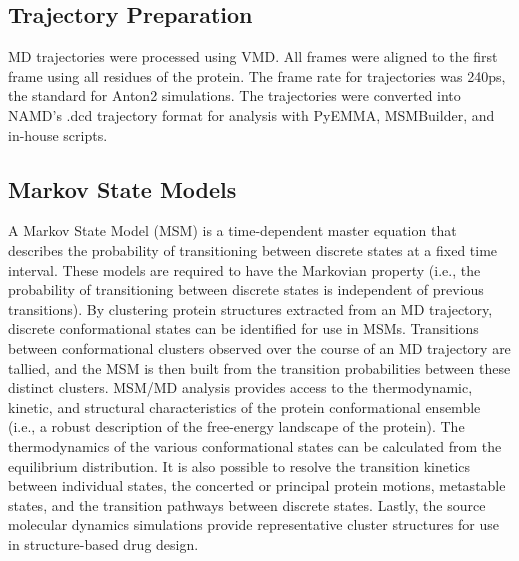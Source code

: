 \documentclass[9pt,twoside]{pnas-new}
\begin{document}
\subsection*{Trajectory Preparation}
MD trajectories were processed using VMD\cite{Humphrey1996}. All frames were aligned to the first frame using all residues of the protein. The frame rate for trajectories was 240ps, the standard for Anton2 simulations. The trajectories were converted into NAMD's .dcd trajectory format for analysis with PyEMMA\cite{Scherer2015}, MSMBuilder\cite{Beauchamp2011}, and in-house scripts.


\subsection*{Markov State Models}
A Markov State Model (MSM) is a time-dependent master equation that describes the probability of transitioning between discrete states at a fixed time interval. These models are required to have the Markovian property (i.e., the probability of transitioning between discrete states is independent of previous transitions). By clustering protein structures extracted from an MD trajectory, discrete conformational states can be identified for use in MSMs\cite{Pande2010,Beauchamp2011,Prinz2011,Prinz2011a}. Transitions between conformational clusters observed over the course of an MD trajectory are tallied, and the MSM is then built from the transition probabilities between these distinct clusters. MSM/MD analysis provides access to the thermodynamic, kinetic, and structural characteristics of the protein conformational ensemble (i.e., a robust description of the free-energy landscape of the protein)\cite{Pande2010,Beauchamp2011,Prinz2011,Prinz2011a,Senne2012,Cronkite-Ratcliff2013}. The thermodynamics of the various conformational states can be calculated from the equilibrium distribution. It is also possible to resolve the transition kinetics between individual states, the concerted or principal protein motions, metastable states, and the transition pathways between discrete states\cite{Beauchamp2011,Prinz2011,Senne2012}. Lastly, the source molecular dynamics simulations provide representative cluster structures for use in structure-based drug design\cite{Cronkite-Ratcliff2013}.
\end{document}

